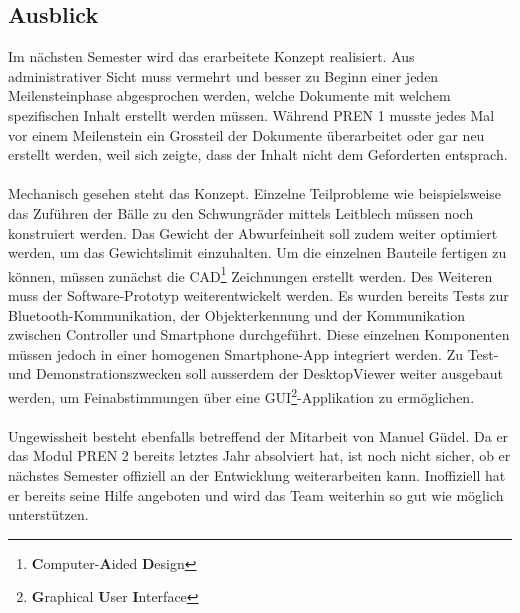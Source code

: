 \subsection{Ausblick}
Im nächsten Semester wird das erarbeitete Konzept realisiert. Aus administrativer 
Sicht muss vermehrt und besser zu Beginn einer jeden Meilensteinphase abgesprochen 
werden, welche Dokumente mit welchem spezifischen Inhalt erstellt werden müssen. 
Während PREN 1 musste jedes Mal vor einem Meilenstein ein Grossteil der 
Dokumente überarbeitet oder gar neu erstellt werden, weil sich zeigte, dass der 
Inhalt nicht dem Geforderten entsprach.\\
\\
Mechanisch gesehen steht das Konzept. Einzelne Teilprobleme wie beispielsweise 
das Zuführen der Bälle zu den Schwungräder mittels Leitblech müssen noch konstruiert 
werden. Das Gewicht der Abwurfeinheit soll zudem weiter optimiert werden, um das 
Gewichtslimit einzuhalten. Um die einzelnen Bauteile fertigen zu können, müssen 
zunächst die CAD\footnote{\textbf{C}omputer-\textbf{A}ided \textbf{D}esign} 
Zeichnungen erstellt werden. Des Weiteren muss der Software-Prototyp weiterentwickelt werden. Es wurden bereits Tests zur Bluetooth-Kommunikation, der 
Objekterkennung und der Kommunikation zwischen Controller und Smartphone 
durchgeführt. Diese einzelnen Komponenten müssen jedoch in einer homogenen 
Smartphone-App integriert werden. Zu Test- und Demonstrationszwecken soll ausserdem 
der DesktopViewer weiter ausgebaut werden, um Feinabstimmungen über eine 
GUI\footnote{\textbf{G}raphical \textbf{U}ser \textbf{I}nterface}-Applikation zu 
ermöglichen.\\
\\
Ungewissheit besteht ebenfalls betreffend der Mitarbeit von Manuel Güdel. Da er 
das Modul PREN 2 bereits letztes Jahr absolviert hat, ist noch nicht sicher, ob 
er nächstes Semester offiziell an der Entwicklung weiterarbeiten kann. Inoffiziell 
hat er bereits seine Hilfe angeboten und wird das Team weiterhin so gut wie möglich 
unterstützen.
